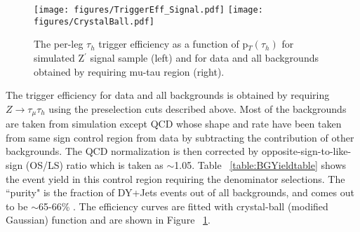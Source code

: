 \begin{figure}[tbh!]
  \centering
    \texttt{[image: figures/TriggerEff\_Signal.pdf]}
    \texttt{[image: figures/CrystalBall.pdf]}
  \caption{The per-leg $\tau_{h}$ trigger efficiency as a function of p$_{T}(\tau_{h})$ for simulated Z$^{\prime}$ signal sample (left) and for data and all backgrounds obtained by requiring mu-tau region (right).}
  \label{fig:trigger}
\end{figure}

The trigger efficiency for data and all backgrounds is obtained by requiring $Z\to\tau_{\mu} \tau_{h}$ using the preselection cuts described above. Most of the backgrounds are taken from simulation except QCD whose shape and rate have been taken from same sign control region from data by subtracting the contribution of other backgrounds. The QCD normalization is  then corrected by opposite-sign-to-like-sign (OS/LS) ratio which is taken as $\sim$1.05. Table ~\ref{table:BGYieldtable} shows the event yield in this control region requiring the denominator selections. The ``purity" is the fraction of DY+Jets events out of all backgrounds, and comes out to be $\sim$65-66\% . The efficiency curves are fitted with crystal-ball (modified Gaussian) function and are shown in Figure ~\ref{fig:trigger}.

\begin{table}[!htpb]
   \caption{The number of events in the mu-tau control region after requiring the denominator level selection criteria}
   \label{table:BGYieldtable} %
 \end{table}
